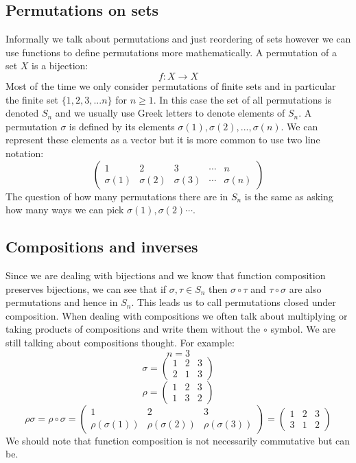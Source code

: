 \documentclass[12pt]{article}
\begin{document}
\subsection*{Permutations on sets}
Informally we talk about permutations and just reordering of sets however we can use functions to define permutations more mathematically. A permutation of a set \(X\) is a bijection:
\[f:X\to X\]
Most of the time we only consider permutations of finite sets and in particular the finite set \(\{1,2,3,...n\}\) for \(n\geq 1\). In this case the set of all permutations is denoted \(S_n\) and we usually use Greek letters to denote elements of \(S_n\). A permutation \(\sigma\) is defined by its elements \(\sigma(1),\sigma(2),...,\sigma(n)\). We can represent these elements as a vector but it is more common to use two line notation:
\[\begin{pmatrix}
    1 & 2 & 3 & \cdots & n \\
    \sigma(1) & \sigma(2) & \sigma(3) & \cdots & \sigma(n)
\end{pmatrix}\]
The question of how many permutations there are in \(S_n\) is the same as asking how many ways we can pick \(\sigma(1),\sigma(2)\cdots\).
\subsection*{Compositions and inverses}
Since we are dealing with bijections and we know that function composition preserves bijections, we can see that if \(\sigma,\tau\in S_n\) then \(\sigma\circ\tau\) and \(\tau\circ\sigma\) are also permutations and hence in \(S_n\). This leads us to call permutations closed under composition. When dealing with compositions we often talk about multiplying or taking products of compositions and write them without the \(\circ\) symbol. We are still talking about compositions thought. For example:
\[n=3\]
\[\sigma=\begin{pmatrix}
    1 & 2 & 3 \\
    2 & 1 & 3
\end{pmatrix}\]
\[\rho=\begin{pmatrix}
    1 & 2 & 3 \\
    1 & 3 & 2
\end{pmatrix}\]
\[\rho\sigma = \rho\circ \sigma = \begin{pmatrix}
    1 & 2 & 3 \\
    \rho(\sigma(1)) & \rho(\sigma(2)) & \rho(\sigma(3))
\end{pmatrix}=\begin{pmatrix}
    1 & 2 & 3 \\
    3 & 1 & 2
\end{pmatrix}\]
We should note that function composition is not necessarily commutative but can be. 
\end{document}
